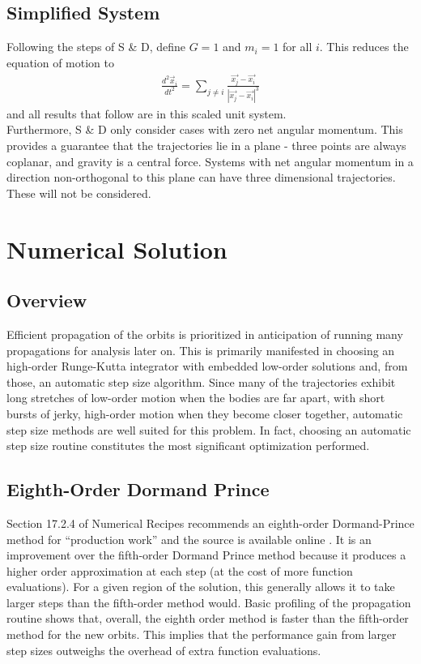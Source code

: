 \documentclass[12pt]{article}
\begin{document}
\subsection{Simplified System}
Following the steps of S \& D, define $G = 1$ and $m_i = 1$ for all $i$. This reduces the equation of motion to
\begin{align*}
\frac{d^2\vec{x}_i}{dt^2} = \sum_{j \neq i} \frac{\vec{x_j}-\vec{x_i}}{|\vec{x_j}-\vec{x_i}|^3}
\end{align*}
and all results that follow are in this scaled unit system. \\

Furthermore, S \& D only consider cases with zero net angular momentum. This provides a guarantee that the trajectories lie in a plane - three points are always coplanar, and gravity is a central force. Systems with net angular momentum in a direction non-orthogonal to this plane can have three dimensional trajectories. These will not be considered.
\section{Numerical Solution}
\subsection{Overview}
Efficient propagation of the orbits is prioritized in anticipation of running many propagations for analysis later on. This is primarily manifested in choosing an high-order Runge-Kutta integrator with embedded low-order solutions and, from those, an automatic step size algorithm. Since many of the trajectories exhibit long stretches of low-order motion when the bodies are far apart, with short bursts of jerky, high-order motion when they become closer together, automatic step size methods are well suited for this problem. In fact, choosing an automatic step size routine constitutes the most significant optimization performed.

\subsection{Eighth-Order Dormand Prince}
Section 17.2.4 of Numerical Recipes \cite{numericalrecipes} recommends an eighth-order Dormand-Prince method for ``production work'' and the source is available online \cite{nrwebnote}. It is an improvement over the fifth-order Dormand Prince method because it produces a higher order approximation at each step (at the cost of more function evaluations). For a given region of the solution, this generally allows it to take larger steps than the fifth-order method would. Basic profiling of the propagation routine shows that, overall, the eighth order method is faster than the fifth-order method for the new orbits. This implies that the performance gain from larger step sizes outweighs the overhead of extra function evaluations. \\
\end{document}
